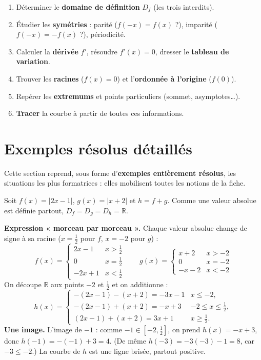 \documentclass[11pt,a4paper]{article}
\newcommand{\R}{\mathbb{R}}
\newcommand{\Df}{D_f}
\begin{document}
\begin{methode}
\begin{enumerate}[leftmargin=1.8em,topsep=2pt,itemsep=1.5pt]
  \item Déterminer le \textbf{domaine de définition} $\Df$ (les trois interdits).
  \item Étudier les \textbf{symétries} : parité ($f(-x)=f(x)$ ?), imparité ($f(-x)=-f(x)$ ?), périodicité.
  \item Calculer la \textbf{dérivée} $f'$, résoudre $f'(x)=0$, dresser le \textbf{tableau de variation}.
  \item Trouver les \textbf{racines} ($f(x)=0$) et l'\textbf{ordonnée à l'origine} ($f(0)$).
  \item Repérer les \textbf{extremums} et points particuliers (sommet, asymptotes\dots).
  \item \textbf{Tracer} la courbe à partir de toutes ces informations.
\end{enumerate}
\end{methode}

\section{Exemples résolus détaillés}
Cette section reprend, sous forme d'\textbf{exemples entièrement résolus}, les situations
les plus formatrices : elles mobilisent toutes les notions de la fiche.

\begin{exemple}[Somme de deux valeurs absolues : $h(x)=\lvert 2x-1\rvert+\lvert x+2\rvert$]
Soit $f(x)=\lvert 2x-1\rvert$, $g(x)=\lvert x+2\rvert$ et $h=f+g$. Comme une valeur
absolue est définie partout, $\Df=D_g=D_h=\R$.

\smallskip
\textbf{Expression « morceau par morceau ».} Chaque valeur absolue change de signe à sa
racine ($x=\frac12$ pour $f$, $x=-2$ pour $g$) :
\[
  f(x)=\begin{cases} 2x-1 & x>\tfrac12\\ 0 & x=\tfrac12\\ -2x+1 & x<\tfrac12\end{cases}
  \qquad
  g(x)=\begin{cases} x+2 & x>-2\\ 0 & x=-2\\ -x-2 & x<-2\end{cases}
\]
On découpe $\R$ aux points $-2$ et $\frac12$ et on additionne :
\[
  h(x)=\begin{cases}
    -(2x-1)-(x+2)=-3x-1 & x\leq -2,\\[2pt]
    -(2x-1)+(x+2)=-x+3 & -2\leq x\leq \tfrac12,\\[2pt]
    (2x-1)+(x+2)=3x+1 & x\geq \tfrac12.
  \end{cases}
\]
\textbf{Une image.} L'image de $-1$ : comme $-1\in\left[-2,\tfrac12\right]$, on prend
$h(x)=-x+3$, donc $h(-1)=-(-1)+3=4$. (De même $h(-3)=-3(-3)-1=8$, car $-3\leq -2$.)
La courbe de $h$ est une ligne brisée, partout positive.
\end{exemple}
\end{document}
